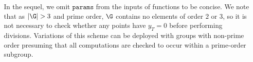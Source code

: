 \documentclass[11pt,letterpaper]{article}
\theoremstyle{definition}
\newcommand{\6}{\mathbf}
\newcommand{\7}{\mathcal}
\begin{document}

In the sequel, we omit $\texttt{params}$ from the inputs of functions to be concise. We note that as $\left|\G\right| > 3$ and prime order, $\G$ contains no elements of order $2$ or $3$, so it is not necessary to check whether any points have $y_T = 0$ before performing divisions. Variations of this scheme can be deployed with groups with non-prime order presuming that all computations are checked to occur within a prime-order subgroup. 
\end{document}
